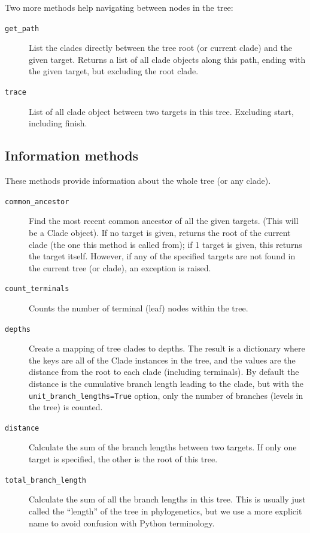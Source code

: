 \documentclass{report}
\begin{document}
Two more methods help navigating between nodes in the tree:

\begin{description}
  \item[\texttt{get\_path}]
    List the clades directly between the tree root (or current clade) and the given target.
    Returns a list of all clade objects along this path, ending with the given target, but
    excluding the root clade.

  \item[\texttt{trace}]
    List of all clade object between two targets in this tree. Excluding start, including
    finish.

\end{description}

\subsection{Information methods}

These methods provide information about the whole tree (or any clade).

\begin{description}
  \item[\texttt{common\_ancestor}]
    Find the most recent common ancestor of all the given targets. (This will be a Clade object). 
    If no target is given, returns the root of the current clade (the one this method is called
    from); if 1 target is given, this returns the target itself.  However, if any of the
    specified targets are not found in the current tree (or clade), an exception is raised.

  \item[\texttt{count\_terminals}]
    Counts the number of terminal (leaf) nodes within the tree.

  \item[\texttt{depths}]
    Create a mapping of tree clades to depths. The result is a dictionary where the keys are
    all of the Clade instances in the tree, and the values are the distance from the root to
    each clade (including terminals). By default the distance is the cumulative branch length
    leading to the clade, but with the \verb|unit_branch_lengths=True| option, only the number
    of branches (levels in the tree) is counted.

  \item[\texttt{distance}]
    Calculate the sum of the branch lengths between two targets.  If only one target is
    specified, the other is the root of this tree.

  \item[\texttt{total\_branch\_length}]
    Calculate the sum of all the branch lengths in this tree. This is usually just called the
    ``length'' of the tree in phylogenetics, but we use a more explicit name to avoid confusion
    with Python terminology.

\end{description}
\end{document}
